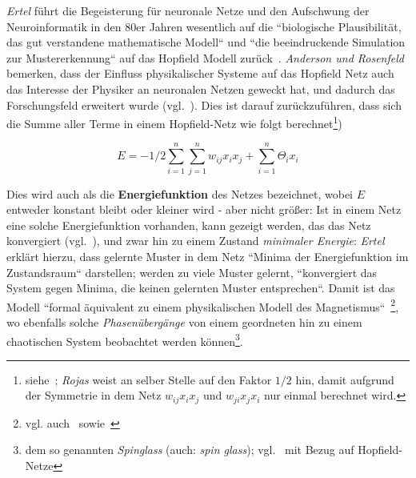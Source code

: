 \textit{Ertel} führt die Begeisterung für neuronale Netze und den Aufschwung der Neuroinformatik in den 80er Jahren wesentlich auf die ``biologische Plausibilität, das gut verstandene mathematische Modell`` und ``die beeindruckende Simulation zur Mustererkennung`` auf das Hopfield Modell zurück~\cite[297]{Ert21b}. \textit{Anderson und Rosenfeld} bemerken, dass der Einfluss physikalischer Systeme auf das Hopfield Netz auch das Interesse der Physiker an neuronalen Netzen geweckt hat, und dadurch das Forschungsfeld erweitert wurde (vgl.~\cite[458]{AR88}). Dies ist darauf zurückzuführen, dass sich die Summe aller Terme in einem Hopfield-Netz wie folgt berechnet\footnote{
    siehe~\cite[287]{Roj93}; \textit{Rojas} weist an selber Stelle auf den Faktor $1/2$ hin, damit aufgrund der Symmetrie in dem Netz $w_{ij}x_ix_j$ und $w_{ji}x_jx_i$ nur einmal berechnet wird.
})

\begin{equation}
E = -1/2  \sum^n_{i=1}\sum^n_{j=1} w_{ij}x_ix_j + \sum^n_{i=1}\Theta_ix_i
\label{eq:gl-energie}
\end{equation}

Dies wird auch als die \textbf{Energiefunktion} des Netzes bezeichnet, wobei $E$ entweder konstant bleibt oder kleiner wird - aber nicht größer: Ist in einem Netz eine solche Energiefunktion vorhanden, kann gezeigt werden, das das Netz konvergiert (vgl.~\cite[139]{Fau94}), und zwar hin zu einem Zustand \textit{minimaler Energie}: \textit{Ertel} erklärt hierzu, dass gelernte Muster in dem Netz ``Minima der Energiefunktion im Zustandsraum`` darstellen; werden zu viele Muster gelernt, ``konvergiert das System gegen Minima, die keinen gelernten Muster entsprechen``.
Damit ist das Modell ``formal äquivalent zu einem physikalischen Modell des Magnetismus``~\cite[293]{Ert21b}\footnote{
    vgl. auch~\cite[417]{AR98} sowie~\cite[2556 f.]{Hop82}
}, wo ebenfalls solche \textit{Phasenübergänge} von einem geordneten hin zu einem chaotischen System beobachtet werden können\footnote{
    dem so genannten \textit{Spinglass} (auch: \textit{spin glass}); vgl.~\cite[900]{BY86} mit Bezug auf Hopfield-Netze
}.\\

